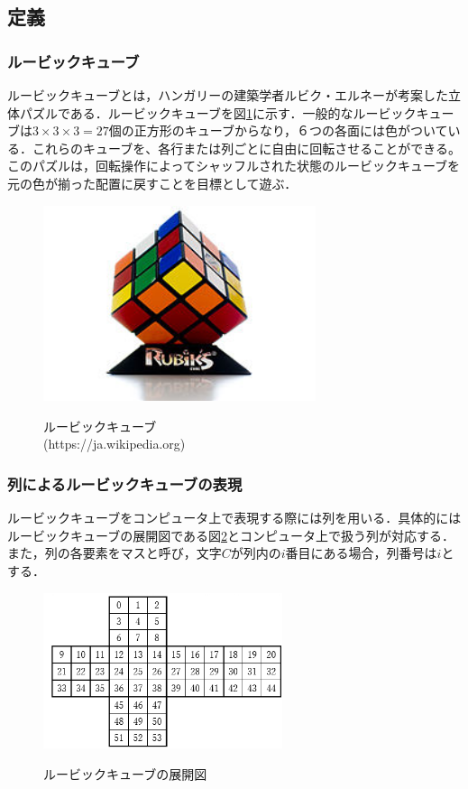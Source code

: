 \documentclass[a4j,titlepage]{jsarticle}
\begin{document}
\subsection{定義}
\subsubsection{ルービックキューブ}
ルービックキューブとは，ハンガリーの建築学者ルビク・エルネーが考案した立体パズルである．ルービックキューブを図\ref{fig:rubik-cube}に示す．一般的なルービックキューブは\(3\times 3\times 3=27\)個の正方形のキューブからなり，６つの各面には色がついている．これらのキューブを、各行または列ごとに自由に回転させることができる。このパズルは，回転操作によってシャッフルされた状態のルービックキューブを元の色が揃った配置に戻すことを目標として遊ぶ．

\begin{figure}
  \centering
  \includegraphics[width=8cm]{./tex_pic/rubik-cube.jpg}\\
  \caption{ルービックキューブ\\(https://ja.wikipedia.org)}
  \label{fig:rubik-cube}
\end{figure}

\subsubsection{列によるルービックキューブの表現}
ルービックキューブをコンピュータ上で表現する際には列を用いる．具体的にはルービックキューブの展開図である図\ref{fig:rubik-cube-Dev}とコンピュータ上で扱う列が対応する．また，列の各要素をマスと呼び，文字\(C\)が列内の\(i\)番目にある場合，列番号は\(i\)とする．

\begin{figure}
\centering
  \includegraphics[width=7cm]{./tex_pic/seq.jpg}\\
  \caption{ルービックキューブの展開図}
  \label{fig:rubik-cube-Dev}
\end{figure}
\end{document}
